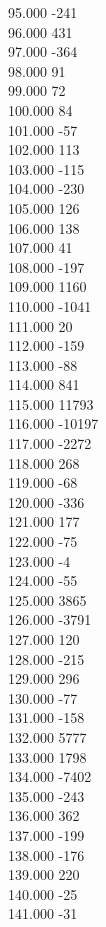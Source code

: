 { 95.000	-241 \\
 96.000	431 \\
 97.000	-364 \\
 98.000	91 \\
 99.000	72 \\
 100.000	84 \\
 101.000	-57 \\
 102.000	113 \\
 103.000	-115 \\
 104.000	-230 \\
 105.000	126 \\
 106.000	138 \\
 107.000	41 \\
 108.000	-197 \\
 109.000	1160 \\
 110.000	-1041 \\
 111.000	20 \\
 112.000	-159 \\
 113.000	-88 \\
 114.000	841 \\
 115.000	11793 \\
 116.000	-10197 \\
 117.000	-2272 \\
 118.000	268 \\
 119.000	-68 \\
 120.000	-336 \\
 121.000	177 \\
 122.000	-75 \\
 123.000	-4 \\
 124.000	-55 \\
 125.000	3865 \\
 126.000	-3791 \\
 127.000	120 \\
 128.000	-215 \\
 129.000	296 \\
 130.000	-77 \\
 131.000	-158 \\
 132.000	5777 \\
 133.000	1798 \\
 134.000	-7402 \\
 135.000	-243 \\
 136.000	362 \\
 137.000	-199 \\
 138.000	-176 \\
 139.000	220 \\
 140.000	-25 \\
 141.000	-31 \\
}
